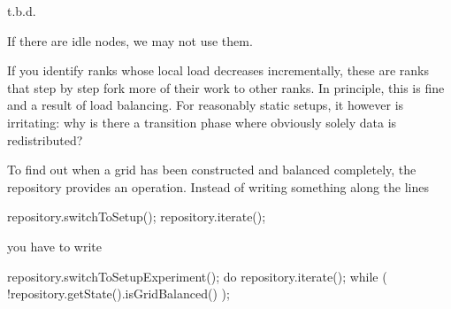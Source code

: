 \begin{smell}
t.b.d.
\end{smell}


If there are idle nodes, we may not use them.

If you identify ranks whose local load decreases incrementally, these are ranks
that step by step fork more of their work to other ranks. 
In principle, this is fine and a result of load balancing. 
For reasonably static setups, it however is irritating: 
why is there a transition phase where obviously solely data is
redistributed?





To find out when a grid has been constructed and balanced completely, the
repository provides an operation. Instead of writing something along the lines

\begin{code}
  repository.switchToSetup();
  repository.iterate();
\end{code}

\noindent
you have to write
\begin{code}
  repository.switchToSetupExperiment();
  do {
    repository.iterate();
  } while ( !repository.getState().isGridBalanced() );
\end{code}




